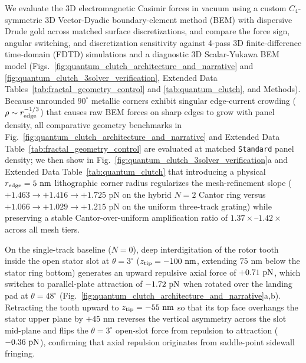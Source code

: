 \documentclass[pdflatex,sn-nature]{sn-jnl}
\DeclareRobustCommand{\roundtwo}[1]{\fpeval{round(#1,2)}}
\begin{document}
We evaluate the 3D electromagnetic Casimir forces in vacuum using a custom $C_4$-symmetric 3D Vector-Dyadic boundary-element method (BEM) with dispersive Drude gold across matched surface discretizations, and compare the force sign, angular switching, and discretization sensitivity against 4-pass 3D finite-difference time-domain (FDTD) simulations and a diagnostic 3D Scalar-Yukawa BEM model\cite{rodriguez2009pra,oskooi2010,rodriguez2011,reid2013pra} (Figs.~\ref{fig:quantum_clutch_architecture_and_narrative} and \ref{fig:quantum_clutch_3solver_verification}, Extended Data Tables~\ref{tab:fractal_geometry_control} and \ref{tab:quantum_clutch}, and Methods). Because unrounded $90^\circ$ metallic corners exhibit singular edge-current crowding ($\rho \sim r_{\rm edge}^{-1/3}$) that causes raw BEM forces on sharp edges to grow with panel density, all comparative geometry benchmarks in Fig.~\ref{fig:quantum_clutch_architecture_and_narrative} and Extended Data Table~\ref{tab:fractal_geometry_control} are evaluated at matched \texttt{Standard} panel density; we then show in Fig.~\ref{fig:quantum_clutch_3solver_verification}a and Extended Data Table~\ref{tab:quantum_clutch} that introducing a physical $r_{\rm edge} = 5\text{ nm}$ lithographic corner radius regularizes the mesh-refinement slope ($+1.463 \to +1.416 \to +1.725\text{ pN}$ on the hybrid $N=2$ Cantor ring versus $+1.066 \to +1.029 \to +1.215\text{ pN}$ on the uniform three-track grating) while preserving a stable Cantor-over-uniform amplification ratio of $1.37\times\text{--}1.42\times$ across all mesh tiers.

On the single-track baseline ($N=0$), deep interdigitation of the rotor tooth inside the open stator slot at $\theta=3^\circ$ ($z_{\rm tip} = -100\text{ nm}$, extending $75\text{ nm}$ below the stator ring bottom) generates an upward repulsive axial force of $+\roundtwo{\SingletoothTrackzeroBemThetathreeFZPn}\text{ pN}$, which switches to parallel-plate attraction of $\roundtwo{\SingletoothTrackzeroBemThetafoureightFZPn}\text{ pN}$ when rotated over the landing pad at $\theta=48^\circ$ (Fig.~\ref{fig:quantum_clutch_architecture_and_narrative}a,b). Retracting the tooth upward to $z_{\rm tip} = -55\text{ nm}$ so that its top face overhangs the stator upper plane by $+45\text{ nm}$ reverses the vertical asymmetry across the slot mid-plane and flips the $\theta=3^\circ$ open-slot force from repulsion to attraction ($\roundtwo{\SingletoothTrackzeroOverhangBemThetathreeFZPn}\text{ pN}$), confirming that axial repulsion originates from saddle-point sidewall fringing\cite{levin2010}.
\end{document}
